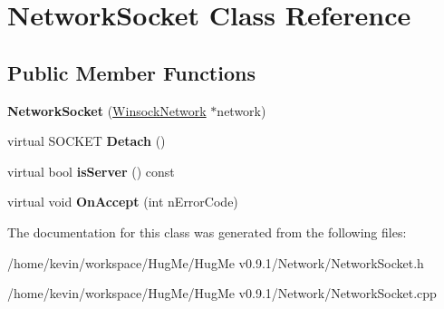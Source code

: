 \hypertarget{classNetworkSocket}{
\section{NetworkSocket Class Reference}
\label{classNetworkSocket}
}
\subsection*{Public Member Functions}
\begin{DoxyCompactItemize}
\item 
\hypertarget{classNetworkSocket_acdeaa6046b82c34b052231e83ed52632}{
{\bfseries NetworkSocket} (\hyperlink{classWinsockNetwork}{WinsockNetwork} $\ast$network)}
\label{classNetworkSocket_acdeaa6046b82c34b052231e83ed52632}

\item 
\hypertarget{classNetworkSocket_a9ac28b209fad28645fd7d92d23c98c75}{
virtual SOCKET {\bfseries Detach} ()}
\label{classNetworkSocket_a9ac28b209fad28645fd7d92d23c98c75}

\item 
\hypertarget{classNetworkSocket_a1a7420b1acbee18bd95d530e6c4867e7}{
virtual bool {\bfseries isServer} () const }
\label{classNetworkSocket_a1a7420b1acbee18bd95d530e6c4867e7}

\item 
\hypertarget{classNetworkSocket_a2f5d8b1ef1b262fd6106b59344e4af3d}{
virtual void {\bfseries OnAccept} (int nErrorCode)}
\label{classNetworkSocket_a2f5d8b1ef1b262fd6106b59344e4af3d}

\end{DoxyCompactItemize}


The documentation for this class was generated from the following files:\begin{DoxyCompactItemize}
\item 
/home/kevin/workspace/HugMe/HugMe v0.9.1/Network/NetworkSocket.h\item 
/home/kevin/workspace/HugMe/HugMe v0.9.1/Network/NetworkSocket.cpp\end{DoxyCompactItemize}

